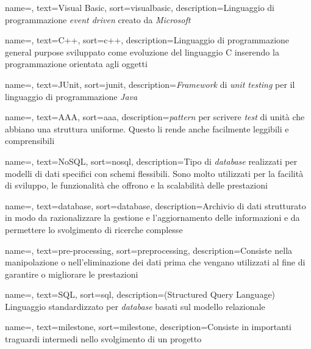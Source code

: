 {
    name=,
    text=Visual Basic,
    sort=visualbasic,
    description={Linguaggio di programmazione \textit{event driven} creato da \textit{Microsoft}}
}

{
    name=,
    text=C++,
    sort=c++,
    description={Linguaggio di programmazione
    general purpose sviluppato come evoluzione del linguaggio C inserendo la programmazione orientata agli oggetti}
}

{
    name=,
    text=JUnit,
    sort=junit,
    description={\textit{Framework} di \textit{unit testing} per il linguaggio di programmazione \textit{Java}}
}

{
    name=,
    text=AAA,
    sort=aaa,
    description={\textit{pattern} per scrivere \textit{test} di unità che abbiano una struttura uniforme. Questo li rende anche facilmente leggibili e comprensibili}
}

{
    name=,
    text=NoSQL,
    sort=nosql,
    description={Tipo di \textit{database} realizzati per modelli di dati specifici con schemi flessibili. Sono molto utilizzati per la facilità di sviluppo, le funzionalità che offrono e la scalabilità delle prestazioni}
}

{
    name=,
    text=database,
    sort=database,
    description={Archivio di dati strutturato in modo da razionalizzare la gestione e l'aggiornamento delle informazioni e da permettere lo svolgimento di ricerche complesse}
}

{
    name=,
    text=pre-processing,
    sort=preprocessing,
    description={Consiste nella manipolazione o nell'eliminazione
    dei dati prima che vengano utilizzati al fine di
    garantire o migliorare le prestazioni}
}

{
    name=,
    text=SQL,
    sort=sql,
    description={(Structured Query Language) Linguaggio standardizzato per \textit{database} basati sul modello relazionale}
}

{
    name=,
    text=milestone,
    sort=milestone,
    description={Consiste in importanti traguardi intermedi nello svolgimento di un progetto}
}


